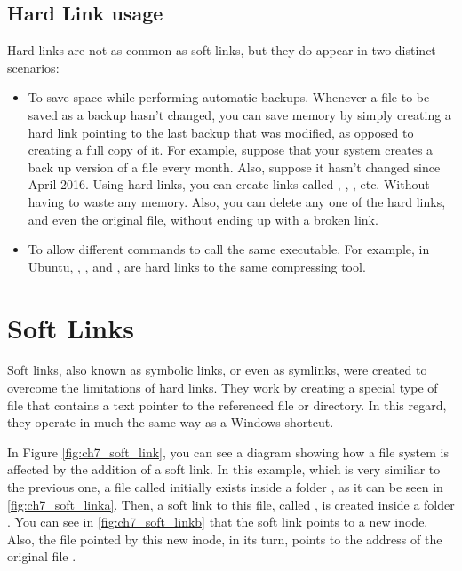 \subsection{Hard Link usage}

Hard links are not as common as soft links, but they do appear in two distinct scenarios:
\begin{itemize}
\item To save space while performing automatic backups. Whenever a file to be saved as a backup hasn't changed, you can save memory by simply creating a hard link pointing to the last backup that was modified, as opposed to creating a full copy of it. For example, suppose that your system creates a back up version of a file  every month. Also, suppose it hasn't changed since April 2016. Using hard links, you can create links called , , , etc. Without having to waste any memory. Also, you can delete any one of the hard links, and even the original file, without ending up with a broken link.
\item To allow different commands to call the same executable. For example, in Ubuntu, , , and , are hard links to the same compressing tool.
\end{itemize}

\section{Soft Links}

Soft  links, also known as symbolic links, or even as symlinks,  were  created  to  overcome  the  limitations  of  hard  links. They work  by  creating  a  special  type  of  file  that  contains  a  text  pointer  to  the  referenced  file  or directory.  In  this  regard,  they  operate  in  much  the  same  way  as  a  Windows  shortcut.

In Figure \ref{fig:ch7_soft_link}, you can see a diagram showing how a file system is affected by the addition of a soft link. In this example, which is very similiar to the previous one, a file called  initially exists inside a folder , as it can be seen in \ref{fig:ch7_soft_linka}. Then, a soft link to this file, called , is created inside a folder . You can see in \ref{fig:ch7_soft_linkb} that the soft link points to a new inode. Also, the file pointed by this new inode, in its turn, points to the address of the original file .

